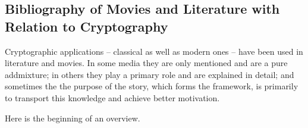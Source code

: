 \newpage
\subsection{Bibliography of Movies and Literature with Relation to Cryptography}
\hypertarget{appendix-movies}{}
\label{s:appendix-movies}


Cryptographic applications -- classical as well as modern ones -- have been
used in literature and movies. In some media they are only mentioned and
are a pure addmixture; in others they play a primary role and are explained
in detail; and sometimes the the purpose of the story, which forms the framework,
is primarily to transport this knowledge and achieve better motivation.

Here is the beginning of an overview.

